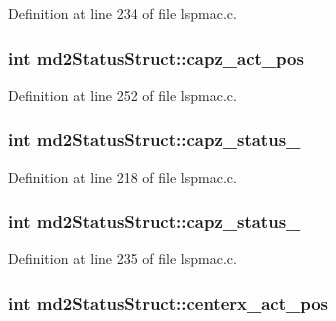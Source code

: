 Definition at line 234 of file lspmac.\-c.

\hypertarget{structmd2StatusStruct_a257c04efac3a33d5d34b21d64c6f1266}{
\subsubsection[{capz\-\_\-act\-\_\-pos}]{\setlength{\rightskip}{0pt plus 5cm}int md2\-Status\-Struct\-::capz\-\_\-act\-\_\-pos}}\label{structmd2StatusStruct_a257c04efac3a33d5d34b21d64c6f1266}


Definition at line 252 of file lspmac.\-c.

\hypertarget{structmd2StatusStruct_a719db4477f35331eaa8b7b44150e88a2}{
\subsubsection[{capz\-\_\-status\-\_\-1}]{\setlength{\rightskip}{0pt plus 5cm}int md2\-Status\-Struct\-::capz\-\_\-status\-\_}}\label{structmd2StatusStruct_a719db4477f35331eaa8b7b44150e88a2}


Definition at line 218 of file lspmac.\-c.

\hypertarget{structmd2StatusStruct_a3abb998bb89433aed16121d0dae6275a}{
\subsubsection[{capz\-\_\-status\-\_\-2}]{\setlength{\rightskip}{0pt plus 5cm}int md2\-Status\-Struct\-::capz\-\_\-status\-\_}}\label{structmd2StatusStruct_a3abb998bb89433aed16121d0dae6275a}


Definition at line 235 of file lspmac.\-c.

\hypertarget{structmd2StatusStruct_ae7924b6e91e1de82f6f7910cb3a9c9bd}{
\subsubsection[{centerx\-\_\-act\-\_\-pos}]{\setlength{\rightskip}{0pt plus 5cm}int md2\-Status\-Struct\-::centerx\-\_\-act\-\_\-pos}}\label{structmd2StatusStruct_ae7924b6e91e1de82f6f7910cb3a9c9bd}



